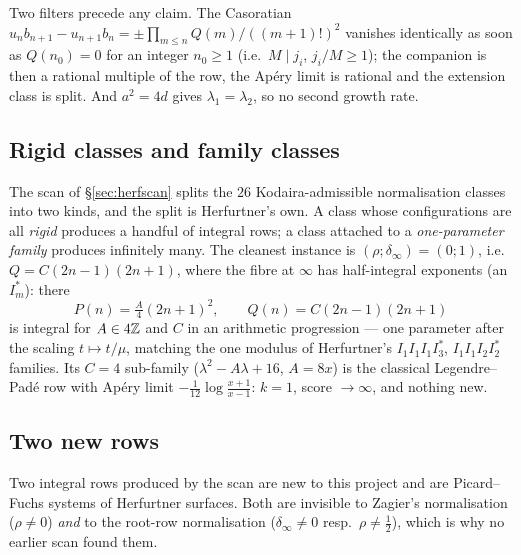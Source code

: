 Two filters precede any claim. The Casoratian
$u_nb_{n+1}-u_{n+1}b_n=\pm\prod_{m\le n}Q(m)/((m+1)!)^2$ vanishes identically as
soon as $Q(n_0)=0$ for an integer $n_0\ge1$ (i.e.\ $M\mid j_i$, $j_i/M\ge1$); the
companion is then a rational multiple of the row, the Ap\'ery limit is rational
and the extension class is split. And $a^2=4d$ gives $\lambda_1=\lambda_2$, so
no second growth rate.

\subsection{Rigid classes and family classes}

The scan of \S\ref{sec:herfscan} splits the $26$ Kodaira-admissible
normalisation classes into two kinds, and the split is Herfurtner's own. A class
whose configurations are all \emph{rigid} produces a handful of integral rows;
a class attached to a \emph{one-parameter family} produces infinitely many. The
cleanest instance is $(\rho;\delta_\infty)=(0;1)$, i.e.\ $Q=C(2n-1)(2n+1)$,
where the fibre at $\infty$ has half-integral exponents (an $I^*_m$): there
\[
P(n)=\tfrac A4(2n+1)^2,\qquad Q(n)=C(2n-1)(2n+1)
\]
is integral for $A\in4\mathbb{Z}$ and $C$ in an arithmetic progression --- one parameter
after the scaling $t\mapsto t/\mu$, matching the one modulus of Herfurtner's
$I_1I_1I_1I_3^*$, $I_1I_1I_2I_2^*$ families. Its $C=4$ sub-family
($\lambda^2-A\lambda+16$, $A=8x$) is the classical Legendre--Pad\'e row with
Ap\'ery limit $-\tfrac1{12}\log\frac{x+1}{x-1}$: $k=1$, score $\to\infty$, and
nothing new.

\subsection{Two new rows}\label{sec:herfnew}

Two integral rows produced by the scan are new to this project and are
Picard--Fuchs systems of Herfurtner surfaces. Both are invisible to Zagier's
normalisation ($\rho\neq0$) \emph{and} to the root-row normalisation
($\delta_\infty\neq0$ resp.\ $\rho\neq\tfrac12$), which is why no earlier scan
found them.

